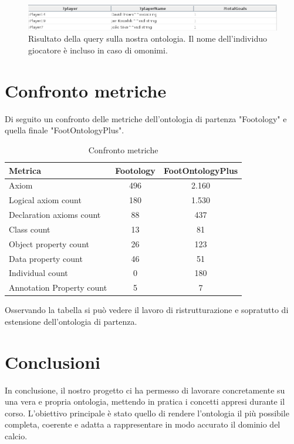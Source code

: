 \documentclass[11pt]{report} %
\begin{document}
\begin{figure}[H]
	\includegraphics[width=\textwidth]{query5}
	\caption{Risultato della query sulla nostra ontologia. Il nome dell'individuo giocatore è incluso in caso di omonimi.}
\end{figure}

\chapter{Confronto metriche}

Di seguito un confronto delle metriche dell'ontologia di partenza "Footology" e quella finale "FootOntologyPlus".

\hfill

\begin{table}[h!]
\centering
\begin{tabular}{|l|c|c|}
\hline
\textbf{Metrica} & \textbf{Footology} & \textbf{FootOntologyPlus} \\
\hline
Axiom & 496 & 2.160 \\
Logical axiom count & 180 & 1.530 \\
Declaration axioms count & 88 & 437 \\
Class count & 13 & 81 \\
Object property count & 26 & 123 \\
Data property count & 46 & 51 \\
Individual count & 0 & 180 \\
Annotation Property count & 5 & 7 \\
\hline
\end{tabular}
\caption{Confronto metriche}
\end{table}

\hfill

Osservando la tabella si può vedere il lavoro di ristrutturazione e sopratutto di estensione dell'ontologia di partenza.


\chapter{Conclusioni}

In conclusione, il nostro progetto ci ha permesso di lavorare concretamente su una vera e propria ontologia, mettendo in pratica i concetti appresi durante il corso. L’obiettivo principale è stato quello di rendere l’ontologia il più possibile completa, coerente e adatta a rappresentare in modo accurato il dominio del calcio.
\end{document}

